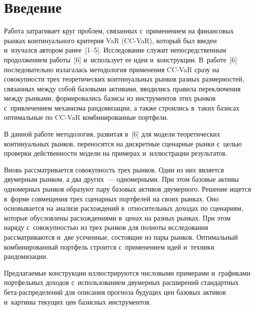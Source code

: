 


\thispagestyle{headings}

\begin{multicols}{2}

\label{st\stat}
  
   
  \section{Введение}
  
  Работа затрагивает круг проблем, связанных с~применением на финансовых 
рынках континуального критерия VaR (CC-VaR), который был введен 
и~изучался автором ранее~[1--5]. Исследование служит непосредственным 
продолжением работы~[6] и~использует ее идеи и~конструкции. В~работе~[6] 
последовательно излагалась методология применения CC-VaR сразу на 
совокупности трех теоретических континуальных рынков разных размерностей, 
связанных между собой базовыми активами, вводились правила переключения 
между рынками, формировались базисы из инструментов этих рынков 
с~привлечением механизма рандомизации, а также строились в~таких базисах 
оптимальные по CC-VaR комбинированные портфели. 
  
  В данной работе методология, развитая в~[6] для модели теоретических 
континуальных рынков, переносится на дискретные сценарные рынки с~\mbox{целью} 
проверки действенности модели на примерах и~иллюстрации результатов. 
  
  Вновь рассматривается совокупность трех рынков. Один из них является 
двумерным рынком, а два других~--- одномерными. При этом базовые активы 
одномерных рынков образуют пару базовых активов двумерного. Решение 
ищется в~форме совмещения трех сценарных портфелей на своих рынках. Оно 
основывается на анализе расхождений в~относительных доходах по сценариям, 
которые обусловлены расхождениями в~ценах на разных рынках. При этом 
наряду с~совокупностью из трех рынков для полноты исследования 
рассматриваются и~две усеченные, состоящие из пары рынков. Оптимальный 
комбинированный портфель строится с~применением идей и~техники 
рандомизации. 
  
  Предлагаемые конструкции иллюстрируются числовыми примерами 
и~графиками портфельных доходов с~использованием двумерных расширений 
стандартных бе\-та-рас\-пре\-де\-ле\-ний для описания прогноза будущих цен 
базовых активов и~картины текущих цен базисных инструментов.


\end{multicols}
